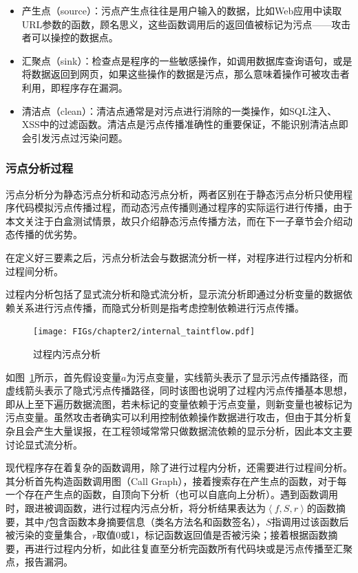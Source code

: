 \begin{itemize}
	\item 产生点（source）：污点产生点往往是用户输入的数据，比如Web应用中读取URL参数的函数，顾名思义，这些函数调用后的返回值被标记为污点——攻击者可以操控的数据点。
	\item 汇聚点（sink）：检查点是程序的一些敏感操作，如调用数据库查询语句，或是将数据返回到网页，如果这些操作的数据是污点，那么意味着操作可被攻击者利用，即程序存在漏洞。
	\item 清洁点（clean）：清洁点通常是对污点进行消除的一类操作，如SQL注入、XSS中的过滤函数。清洁点是污点传播准确性的重要保证，不能识别清洁点即会引发污点过污染问题。
\end{itemize}


\subsubsection{污点分析过程}         
污点分析分为静态污点分析和动态污点分析，两者区别在于静态污点分析只使用程序代码模拟污点传播过程，而动态污点传播则通过程序的实际运行进行传播，由于本文关注于白盒测试情景，故只介绍静态污点传播方法，而在下一子章节会介绍动态传播的优劣势。

在定义好三要素之后，污点分析法会与数据流分析一样，对程序进行过程内分析和过程间分析。

过程内分析包括了显式流分析和隐式流分析，显示流分析即通过分析变量的数据依赖关系进行污点传播，而隐式分析则是指考虑控制依赖进行污点传播。

\begin{figure}[!htbp]
	\centering
	\texttt{[image: FIGs/chapter2/internal\_taintflow.pdf]}
	\caption{过程内污点分析}\label{internalflow}
\end{figure}

如图~\ref{internalflow}所示，首先假设变量$a$为污点变量，实线箭头表示了显示污点传播路径，而虚线箭头表示了隐式污点传播路径，同时该图也说明了过程内污点传播基本思想，即从上至下遍历数据流图，若未标记的变量依赖于污点变量，则新变量也被标记为污点变量。虽然攻击者确实可以利用控制依赖操作数据进行攻击，但由于其分析复杂且会产生大量误报，在工程领域常常只做数据流依赖的显示分析，因此本文主要讨论显式流分析。

现代程序存在着复杂的函数调用，除了进行过程内分析，还需要进行过程间分析。其分析首先构造函数调用图（Call Graph），接着搜索存在产生点的函数，对于每一个存在产生点的函数，自顶向下分析（也可以自底向上分析）。遇到函数调用时，跟进被调函数，进行过程内污点分析，将分析结果表达为$\left\langle f, S, r\right\rangle$的函数摘要，其中$f$包含函数本身摘要信息（类名方法名和函数签名），$S$指调用过该函数后被污染的变量集合，$r$取值0或1，标记函数返回值是否被污染；接着根据函数摘要，再进行过程内分析，如此往复直至分析完函数所有代码块或是污点传播至汇聚点，报告漏洞。

